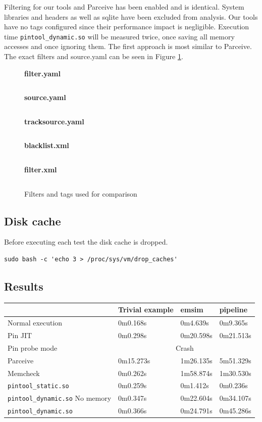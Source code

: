 Filtering for our tools and Parceive has been enabled and is identical. System libraries and headers as well as sqlite have been excluded from analysis. Our tools have no tags configured since their performance impact is negligible. Execution time \texttt{pintool\_dynamic.so} will be measured twice, once saving all memory accesses and once ignoring them. The first approach is most similar to Parceive. The exact filters and source.yaml can be seen in Figure \ref{cap4:compconfig}. 

\begin{figure}
	\begin{center}
		\textbf{filter.yaml}
		\inputminted[linenos, fontsize=\scriptsize]{yaml}{../tests/filter.yaml}
				
		\textbf{source.yaml}
		\inputminted[linenos, fontsize=\scriptsize]{yaml}{../tests/emptysource.yaml}

		\textbf{tracksource.yaml}
		\inputminted[linenos, fontsize=\scriptsize]{yaml}{../tests/tracksource.yaml}
		
		\textbf{blacklist.xml}
		\inputminted[linenos, fontsize=\scriptsize]{xml}{../tests/blacklist.xml}
		
		\textbf{filter.xml}
		\inputminted[linenos, fontsize=\scriptsize]{xml}{../tests/filter.xml}
	\end{center}
	\caption{Filters and tags used for comparison}
	\label{cap4:compconfig}
\end{figure}

\subsection{Disk cache}

Before executing each test the disk cache is dropped.

\begin{lstlisting}[style=BashInputStyle]
sudo bash -c 'echo 3 > /proc/sys/vm/drop_caches'
\end{lstlisting}

\subsection{Results}

\begin{tabular}{l|l|l|l}
	& Trivial example & emsim & pipeline \\ 
	\hline 
	Normal execution & 0m0.168s & 0m4.639s & 0m9.365s \\ 
	\hline 
	Pin JIT & 0m0.298s & 0m20.598s & 0m21.513s \\ 
	\hline 
	Pin probe mode & \multicolumn{3}{c}{Crash} \\ 		
	\hline 
	Parceive & 0m15.273s & 1m26.135s & 5m51.329s \\ 
	\hline 
	Memcheck & 0m0.262s & 1m58.874s & 1m30.530s \\ 
	\hline 
	\texttt{pintool\_static.so} & 0m0.259s & 0m1.412s & 0m0.236s \\ 
	\hline
	\texttt{pintool\_dynamic.so} No memory & 0m0.347s & 0m22.604s & 0m34.107s \\
	\hline
	\texttt{pintool\_dynamic.so} & 0m0.366s & 0m24.791s & 0m45.286s \\
\end{tabular} 